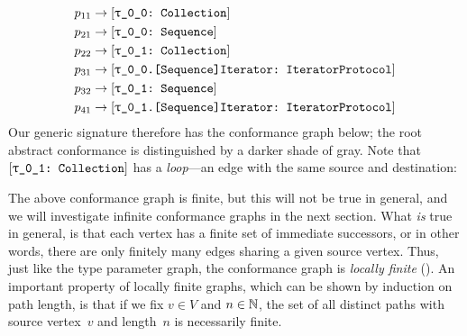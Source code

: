 \documentclass[../generics]{subfiles}
\begin{document}
\begin{example}
\begin{align*}
p_{11}&\rightarrow\ConfReq{\rT}{Collection}\\
p_{21}&\rightarrow\ConfReq{\rT}{Sequence}\\
p_{22}&\rightarrow\ConfReq{\rU}{Collection}\\
p_{31}&\rightarrow\ConfReq{\rT.[Sequence]Iterator}{IteratorProtocol}\\
p_{32}&\rightarrow\ConfReq{\rU}{Sequence}\\
p_{41}&\rightarrow\ConfReq{\rU.[Sequence]Iterator}{IteratorProtocol}
\end{align*}
Our generic signature therefore has the conformance graph below; the root abstract conformance is distinguished by a darker shade of gray. Note that $\ConfReq{\rU}{Collection}$ has a \emph{loop}---an edge with the same source and destination:

\begin{center}
\end{center}
\end{example}

The above conformance graph is finite, but this will not be true in general, and we will investigate infinite conformance graphs in the next section. What \emph{is} true in general, is that each vertex has a finite set of immediate successors, or in other words, there are only finitely many edges sharing a given source vertex. Thus, just like the type parameter graph, the conformance graph is \emph{locally finite} (). An important property of locally finite graphs, which can be shown by induction on path length, is that if we fix $v\in V$ and $n\in\mathbb{N}$, the set of all distinct paths with source vertex~$v$ and length~$n$ is necessarily finite.
\end{document}
